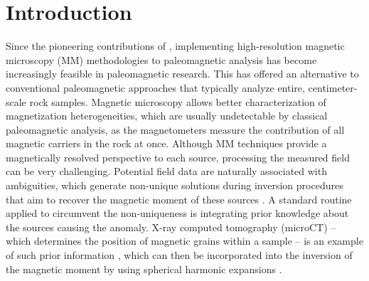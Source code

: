 \section{Introduction}

Since the pioneering contributions of \citet{Egli2000}, implementing high-resolution  magnetic microscopy (MM) methodologies to paleomagnetic analysis has become increasingly feasible in paleomagnetic research. This has offered an alternative to conventional paleomagnetic approaches that typically analyze entire, centimeter-scale rock samples. Magnetic microscopy allows better characterization of magnetization heterogeneities, which are usually undetectable by classical paleomagnetic analysis, as the magnetometers measure the contribution of all magnetic carriers in the rock at once. Although MM techniques provide a magnetically resolved perspective to each source, processing the measured field can be very challenging. Potential field data are naturally associated with ambiguities, which generate non-unique solutions during inversion procedures that aim to recover the magnetic moment of these sources \citep{Blakely1996}. A standard routine applied to circumvent the non-uniqueness is integrating prior knowledge about the sources causing the anomaly. X-ray computed tomography (microCT) -- which determines the position of magnetic grains within a sample \citep{Fabian2019} -- is an example of such prior information \citep[\textit{e.g.}][]{DeGroot2018, DeGroot2021, Koster2023}, which can then be incorporated into the inversion of the magnetic moment by using spherical harmonic expansions \citep[\textit{e.g.}][]{CortesOrtuno2021, CortesOrtuno2022}.

